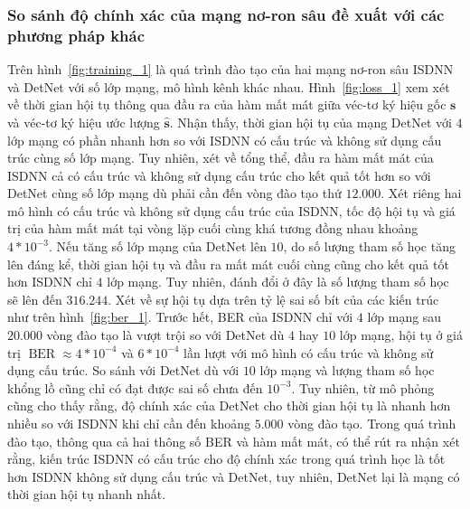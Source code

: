 \subsubsection*{\textbf{So sánh độ chính xác của mạng nơ-ron sâu đề xuất với các phương pháp khác}}
Trên hình~\ref{fig:training_1} là quá trình đào tạo của hai mạng nơ-ron sâu ISDNN và DetNet với số lớp mạng, mô hình kênh khác nhau. Hình~\ref{fig:loss_1} xem xét về thời gian hội tụ thông qua đầu ra của hàm mất mát giữa véc-tơ ký hiệu gốc $\mathbf{s}$ và véc-tơ ký hiệu ước lượng $\mathbf{\hat{s}}$. Nhận thấy, thời gian hội tụ của mạng DetNet với $4$ lớp mạng có phần nhanh hơn so với ISDNN có cấu trúc và không sử dụng cấu trúc cùng số lớp mạng. Tuy nhiên, xét về tổng thể, đầu ra hàm mất mát của ISDNN cả có cấu trúc và không sử dụng cấu trúc cho kết quả tốt hơn so với DetNet cùng số lớp mạng dù phải cần đến vòng đào tạo thứ $12.000$. Xét riêng hai mô hình có cấu trúc và không sử dụng cấu trúc của ISDNN, tốc độ hội tụ và giá trị của hàm mất mát tại vòng lặp cuối cùng khá tương đồng nhau khoảng $4 * 10^{-3}$. Nếu tăng số lớp mạng của DetNet lên $10$, do số lượng tham số học tăng lên đáng kể, thời gian hội tụ và đầu ra mất mát cuối cùng cũng cho kết quả tốt hơn ISDNN chỉ $4$ lớp mạng. Tuy nhiên, đánh đổi ở đây là số lượng tham số học sẽ lên đến $316.244$. Xét về sự hội tụ dựa trên tỷ lệ sai số bít của các kiến trúc như trên hình~\ref{fig:ber_1}. Trước hết, BER của ISDNN chỉ với $4$ lớp mạng sau $20.000$ vòng đào tạo là vượt trội so với DetNet dù $4$ hay $10$ lớp mạng, hội tụ ở giá trị $\operatorname{BER}\approx 4 * 10^{-4}$ và $6*10^{-4}$ lần lượt với mô hình có cấu trúc và không sử dụng cấu trúc. So sánh với DetNet dù với $10$ lớp mạng và lượng tham số học khổng lồ cũng chỉ có đạt được sai số chưa đến $10^{-3}$. Tuy nhiên, từ mô phỏng cũng cho thấy rằng, độ chính xác của DetNet cho thời gian hội tụ là nhanh hơn nhiều so với ISDNN khi chỉ cần đến khoảng $5.000$ vòng đào tạo. Trong quá trình đào tạo, thông qua cả hai thông số BER và hàm mất mát, có thể rút ra nhận xét rằng, kiến trúc ISDNN có cấu trúc cho độ chính xác trong quá trình học là tốt hơn ISDNN không sử dụng cấu trúc và DetNet, tuy nhiên, DetNet lại là mạng có thời gian hội tụ nhanh nhất.

